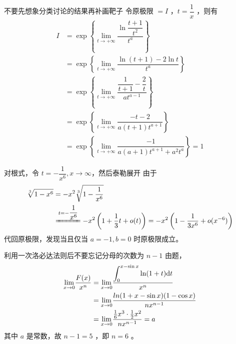 \begin{answer}[660T11]{不要先想象分类讨论的结果再补画靶子}
    令原极限 $ = I $ ，$ t = \dfrac{1}{x} $ ，则有
    \begin{equation*}
        \begin{aligned}
            I &= \exp\left\{{\displaystyle\lim_{t\rightarrow +\infty}}\dfrac{\ln \dfrac{t+1}{t^2}}{t^a}\right\}\\&=
            \exp\left\{{\displaystyle\lim_{t\rightarrow +\infty}}\dfrac{\ln(t+1)-2\ln t}{t^a}\right\}\\&=
            \exp\left\{{\displaystyle\lim_{t\rightarrow +\infty}}\dfrac{\dfrac{1}{t+1}-\dfrac{2}{t}}{at^{a-1}}\right\}
            \\&= \exp\left\{{\displaystyle\lim_{t\rightarrow +\infty}}\dfrac{-t-2}{a(t+1)t^{a+1}}\right\}\\&=
            \exp\left\{{\displaystyle\lim_{t\rightarrow +\infty}}\dfrac{-1}{a(a+1)t^{a+1}+a^2t^a}\right\} = 1
        \end{aligned}
    \end{equation*}
\end{answer}

\begin{answer}[660T17]{对根式，令 $ t=-\dfrac{1}{x^6}, x\rightarrow \infty  $，然后泰勒展开 }
    由于
    \begin{equation*}
        \begin{aligned}
            \dsqrt[3]{1-x^6} &= -x^2\dsqrt[3]{1-\dfrac{1}{x^6}} \\&\xlongequal{t = -\dfrac{1}{x^6}}
            -x^2\left(1+\dfrac{1}{3}t+o(t)\right) = -x^2\left(1-\dfrac{1}{3x^6}+o(x^{-6})\right)
        \end{aligned}
    \end{equation*}
    代回原极限，发现当且仅当 $ a = -1,b = 0 $ 时原极限成立。
\end{answer}

\begin{answer}[660T21]{利用一次洛必达法则后不要忘记分母的次数为 $ n-1 $ }
    由题，\begin{equation*}
        \begin{aligned}
            {\displaystyle\lim_{x\rightarrow 0}}\dfrac{F(x)}{x^n}&=
            {\displaystyle\lim_{x\rightarrow 0}}\dfrac{\displaystyle \int_0^{x-\sin x}\ln(1+t)\mathrm{d}t}{x^n}\\&=
            {\displaystyle\lim_{x\rightarrow 0}}\dfrac{ln(1+x-\sin x)(1-\cos x)}{nx^{n-1}}\\&=
            {\displaystyle\lim_{x\rightarrow 0}}\dfrac{\frac{1}{6}x^3\cdot\frac{1}{2}x^2 }{nx^{n-1}} = a
        \end{aligned}
    \end{equation*}
    其中 $ a $ 是常数，故 $ n-1 = 5 $ ，即 $ n = 6 $ 。
\end{answer}

